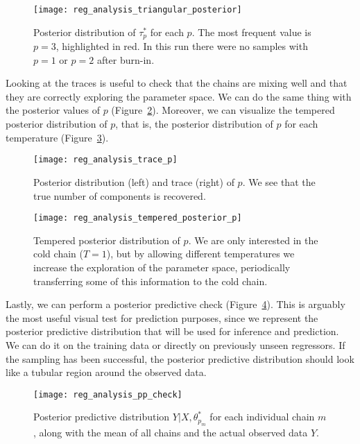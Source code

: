 \begin{figure}[ht!]
  \centering
  \texttt{[image: reg\_analysis\_triangular\_posterior]}
  \caption{Posterior distribution of \(\tau_p^*\) for each \(p\). The most frequent value is \(p=3\), highlighted in red. In this run there were no samples with \(p=1\) or \(p=2\) after burn-in.}\label{fig:triangular-posterior-linear}
\end{figure}

Looking at the traces is useful to check that the chains are mixing well and that they are correctly exploring the parameter space. We can do the same thing with the posterior values of \(p\) (Figure~\ref{fig:trace-p}). Moreover, we can visualize the tempered posterior distribution of \(p\), that is, the posterior distribution of \(p\) for each temperature (Figure~\ref{fig:tempered-posterior-p}).

\begin{figure}[ht!]
  \centering
  \texttt{[image: reg\_analysis\_trace\_p]}
  \caption{Posterior distribution (left) and trace (right) of \(p\). We see that the true number of components is recovered.}\label{fig:trace-p}
\end{figure}

\begin{figure}[ht!]
  \centering
  \texttt{[image: reg\_analysis\_tempered\_posterior\_p]}
  \caption{Tempered posterior distribution of \(p\). We are only interested in the cold chain (\(T=1\)), but by allowing different temperatures we increase the exploration of the parameter space, periodically transferring some of this information to the cold chain.}\label{fig:tempered-posterior-p}
\end{figure}

Lastly, we can perform a posterior predictive check (Figure~\ref{fig:pp-check}). This is arguably the most useful visual test for prediction purposes, since we represent the posterior predictive distribution that will be used for inference and prediction. We can do it on the training data or directly on previously unseen regressors. If the sampling has been successful, the posterior predictive distribution should look like a tubular region around the observed data.

\begin{figure}[ht!]
  \centering
  \texttt{[image: reg\_analysis\_pp\_check]}
  \caption{Posterior predictive distribution \(Y|X, \theta_{p_m}^*\) for each individual chain \(m\), along with the mean of all chains and the actual observed data \(Y\).}\label{fig:pp-check}
\end{figure}

